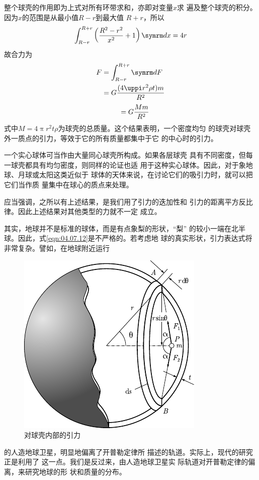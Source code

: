 整个球壳的作用即为上式对所有环带求和，亦即对变量$ x $求
遍及整个球壳的积分。因为$ x $的范围是从最小值$ R - r $到最大值
$ R + r $，所以
\begin{equation}\label{eqn:04.07.11}
 \int _ { R - r } ^ { R + r } \left( \frac { R ^ { 2 } - r ^ { 2 } } { x ^ { 2 } } + 1 \right) \dif x = 4 r
\end{equation}
故合力为
\begin{equation*}
 \begin{aligned}
 F &= \int _ { R - r } ^ { R + r } \dif F \\
&= G \frac { ( 4 \uppi r ^ { 2 } \rho t ) m } { R ^ { 2 } } \\
 \end{aligned}
\end{equation*}
\begin{equation}\label{eqn:04.07.12}
    \mbox \quad = G \frac { M m } { R ^ { 2 } }
\end{equation}
式中$ M = 4 \uppi r ^ { 2 } t \rho $为球壳的总质量。这个结果表明，一个密度均匀
的球壳对球壳外一质点的引力，等效于它的所有质量都集中于它
的中心时的引力。

一个实心球体可当作由大量同心球壳所构成。如果各层球壳
具有不同密度，但每一球壳都具有均匀密度，则同样的论证也适
用于这种实心球体。因此，对于象地球、月球或太阳这类近似于
球体的天体来说，在讨论它们的吸引力时，就可以把它们当作质
量集中在球心的质点来处理。

应当强调，之所以有上述结果，是我们用了引力的迭加性和
引力的距离平方反比律。因此上述结果对其他类型的力就不一定
成立。

其实，地球并不是标准的球体，而是有点象梨的形状，“梨”
的较小一端在北半球。因此，式\eqref{eqn:04.07.12}是不严格的。若考虑地
球的真实形状，引力表达式将非常复杂。譬如，在地球附近运行
\begin{figure}
    \vspace{-0.5em}
 \centering
 \includegraphics{figure/fig04.11}
 \caption{对球壳内部的引力}
 \label{fig:04.11}
\end{figure}
的人造地球卫星，明显地偏离了开普勒定律所
描述的轨道。实际上，现代的研究正是利用了
这一点。我们是反过来，由人造地球卫星实
际轨道对开普勒定律的偏离，来研究地球的形
状和质量的分布。

